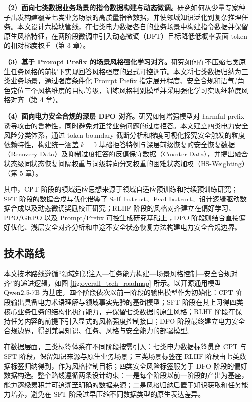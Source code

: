 \documentclass[fontset=fandol,type=master,campus=shenzhen,etitleauto=true]{hithesisbook}
\begin{document}
\textbf{（2）面向七类数据业务场景的指令数据构建与动态微调。}研究如何从少量专家种子出发构建覆盖七类业务场景的高质量指令数据，并使领域知识泛化到复杂推理任务。本文设计六模块管线，在七类电力数据各自的业务场景中构建指令数据并保留原生风格特征，在两阶段微调中引入动态微调（DFT）目标降低低概率表面 token 的相对梯度权重（第 3 章）。

\textbf{（3）基于 Prompt Prefix 的场景风格强化学习对齐。}研究如何在不压缩七类原生任务风格的前提下实现回答风格强度的显式可控调节。本文将七类数据归纳为三类业务场景，通过强度条件化 Prompt Prefix 指定展开程度、安全合规和语气/角色定位三个风格维度的目标等级，训练风格判别模型并采用强化学习实现细粒度风格对齐（第 4 章）。

\textbf{（4）面向电力安全合规的深层 DPO 对齐。}研究如何增强模型对 harmful prefix 诱导攻击的鲁棒性，同时避免对正常业务问题的过度拒答。本文建立四类电力安全风险分类体系，通过 token-boundary 截断分析和梯度可视化探究安全触发的粒度依赖特性，构建统一涵盖 $k=0$ 基础拒答特例与深层前缀恢复的安全恢复数据（Recovery Data）及抑制过度拒答的反偏保守数据（Counter Data），并提出融合状态级同状态恢复间隔权重与词级转向分叉权重的困难状态加权（HS-Weighting）（第 5 章）。

其中，CPT 阶段的领域适应思想来源于领域自适应预训练和持续预训练研究\cite{ref6,ref52}；SFT 阶段的数据合成与优化借鉴了 Self-Instruct、Evol-Instruct、设计逻辑驱动数据合成以及动态微调奖励校正研究\cite{ref24,ref25,ref53,ref54,ref82}；RLHF 阶段的风格对齐建立在偏好学习、PPO/GRPO 以及 Prompt/Prefix 可控生成研究基础上\cite{ref30,ref31,ref32,ref33,ref34,ref35,ref36,ref37,ref38,ref39}；DPO 阶段则结合直接偏好优化、浅层安全对齐分析和中途不安全状态恢复方法构建电力安全合规边界\cite{ref40,ref44,ref45,ref46,ref47,ref48,ref83,ref84}。

\subsection{技术路线}

本文技术路线遵循“领域知识注入—任务能力构建—场景风格控制—安全合规对齐”的递进逻辑，如图 \ref{fig:overall_tech_roadmap} 所示。以开源通用模型 Qwen2.5-7B\cite{ref55} 为基座，四个阶段依次以前一阶段的输出模型作为初始化：CPT 阶段输出具备电力术语理解与领域事实先验的基础模型；SFT 阶段在其上习得四类核心业务任务的结构化执行能力，并保留七类数据的原生风格；RLHF 阶段在保持任务内容的前提下引入显式的风格强度控制接口；DPO 阶段最终建立电力安全合规边界，得到兼具知识、任务、风格与安全能力的部署模型。

在数据层面，三类标签体系在不同阶段按需引入：七类电力数据标签贯穿 CPT 与 SFT 阶段，保留知识来源与原生业务场景；三类场景标签在 RLHF 阶段由七类数据标签归纳得到，作为风格控制目标；四类安全风险标签服务于 DPO 阶段的偏好数据构造。整个路线遵循两条设计约束：一是每个阶段以前一阶段的产出为基座，能力逐级累积并可追溯至明确的数据来源；二是风格归纳后置于知识获取和任务能力培养，避免在 SFT 阶段过早压缩不同数据类型的原生表达差异。
\end{document}

